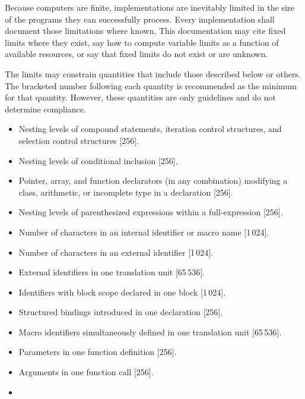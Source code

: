 
\pnum
Because computers are finite, \Cpp{}  implementations are inevitably
limited in the size of the programs they can successfully process.
Every implementation shall
document those limitations where known.
This documentation may cite fixed limits where they
exist, say how to compute variable limits as a function
of available resources, or say that fixed limits do not exist
or are unknown.

\pnum
The limits may constrain quantities
that include those described below or others.
The bracketed number following each quantity is recommended
as the minimum for that quantity.
However, these quantities are only guidelines and do not determine compliance.
\begin{itemize}
\item%
Nesting levels of compound statements,
iteration control structures,
and selection control structures [256].
\item%
Nesting levels of conditional inclusion [256].
\item%
Pointer, array, and function declarators
(in any combination)
modifying a class, arithmetic,
or incomplete type in a declaration [256].
\item%
Nesting levels of parenthesized expressions within a full-expression [256].
\item%
Number of
characters in an internal identifier
or macro name [1\,024].
\item%
Number of
characters in an external identifier [1\,024].
\item%
External identifiers in one translation unit [65\,536].
\item%
Identifiers with block scope declared in one block [1\,024].
\item%
Structured bindings introduced in one declaration [256].
\item%
Macro identifiers simultaneously defined in one
translation
unit [65\,536].
\item%
Parameters in one function definition [256].
\item%
Arguments in one function call [256].
\item%

\end{itemize}
